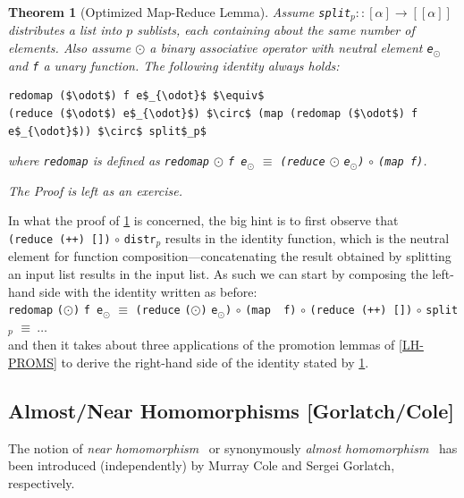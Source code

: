 \documentclass[acmsmall,review]{acmart}\settopmatter{printfolios=true,printccs=false,printacmref=false}
\newtheorem{mytheo}{Theorem}
\begin{document}
\newpage
\begin{mytheo}[Optimized Map-Reduce Lemma]\label{Lemma-Map-Red}
Assume {\tt split$_p :: [\alpha] \rightarrow [[\alpha]]$}
distributes a list into $p$ sublists, each containing about 
the same number of elements. Also assume $\odot$ a binary 
associative operator with neutral element {\tt e$_{\odot}$} 
and {\tt f} a unary function. The following identity always holds:
\begin{lstlisting}[mathescape=true]
redomap ($\odot$) f e$_{\odot}$ $\equiv$
(reduce ($\odot$) e$_{\odot}$) $\circ$ (map (redomap ($\odot$) f e$_{\odot}$)) $\circ$ split$_p$
\end{lstlisting}\vspace{-2ex}

where \lstinline{redomap} is defined as
\lstinline{redomap} $\odot$ {\tt f e$_{\odot}$} $\equiv$ \lstinline{(reduce} $\odot$ {\tt e$_{\odot}$)} $\circ$ \lstinline{(map f)}.

\emph{The Proof} is left as an exercise. 
\end{mytheo}

In what the proof of \cref{Lemma-Map-Red} is concerned, the big hint is to first 
observe that\\
\lstinline{(reduce (++) [])} $\circ$  {\tt distr$_p$} results in the identity function,
which is the neutral element for function composition---concatenating the result obtained
by splitting an input list results in the input list. As such we can start
by composing the left-hand side with the identity written as before:\\
\lstinline{redomap} {\tt($\odot$)} {\tt f e$_{\odot}$} $\equiv$ \lstinline{(reduce} {\tt($\odot$)} {\tt e$_{\odot}$)} $\circ$ \lstinline{(map  f)} $\circ$ \lstinline{(reduce (++) [])} $\circ$ {\tt split$_p$} $\equiv~\ldots$\\
and then it takes about three applications of the promotion lemmas of \cref{LH-PROMS} 
to derive the right-hand side of the identity stated by \cref{Lemma-Map-Red}. 

\subsection{Almost/Near Homomorphisms [Gorlatch/Cole]}

The notion of \emph{near homomorphism}~\cite{ColeNearHom} or 
synonymously \emph{almost homomorphism}~\cite{Gorlatch:AntiUnif} 
has been introduced (independently) by Murray Cole and 
Sergei Gorlatch, respectively. 
\end{document}
